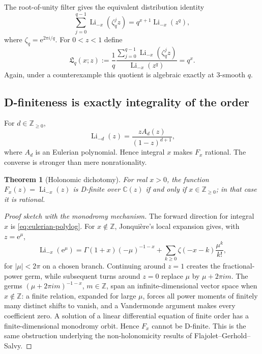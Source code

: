 \documentclass[11pt]{article}
\numberwithin{equation}{section}
\newtheorem{theorem}{Theorem}[section]
\theoremstyle{definition}
\theoremstyle{remark}
\newcommand{\Z}{\mathbb{Z}}
\newcommand{\C}{\mathbb{C}}
\newcommand{\Li}{\operatorname{Li}}
\newcommand{\e}{\mathrm{e}}
\begin{document}
The root-of-unity filter gives the equivalent distribution identity
\begin{equation}
 \sum_{j=0}^{q-1}\Li_{-x}(\zeta_q^jz)
 =q^{x+1}\Li_{-x}(z^q),
 \label{eq:polylog-distribution}
\end{equation}
where $\zeta_q=\e^{2\pi i/q}$.  For $0<z<1$ define
\begin{equation}
 \mathfrak L_q(x;z):=
 \frac{1}{q}\frac{\sum_{j=0}^{q-1}\Li_{-x}(\zeta_q^jz)}{\Li_{-x}(z^q)}=q^x.
 \label{eq:Lq}
\end{equation}
Again, under a counterexample this quotient is algebraic exactly at $3$-smooth $q$.

\subsection{D-finiteness is exactly integrality of the order}
For $d\in\Z_{\ge0}$,
\begin{equation}
 \Li_{-d}(z)=\frac{zA_d(z)}{(1-z)^{d+1}},
 \label{eq:eulerian-polylog}
\end{equation}
where $A_d$ is an Eulerian polynomial.  Hence integral $x$ makes $F_x$ rational.  The converse is stronger than mere nonrationality.

\begin{theorem}[Holonomic dichotomy]
\label{thm:holonomic}
For real $x>0$, the function $F_x(z)=\Li_{-x}(z)$ is D-finite over $\C(z)$ if and only if $x\in\Z_{\ge0}$; in that case it is rational.
\end{theorem}

\begin{proof}[Proof sketch with the monodromy mechanism]
The forward direction for integral $x$ is \eqref{eq:eulerian-polylog}.  For $x\notin\Z$, Jonqui\`ere's local expansion gives, with $z=\e^\mu$,
\begin{equation}
 \Li_{-x}(\e^\mu)
 =\Gamma(1+x)(-\mu)^{-1-x}
  +\sum_{k\ge0}\zeta(-x-k)\frac{\mu^k}{k!},
 \label{eq:jonquiere}
\end{equation}
for $|\mu|<2\pi$ on a chosen branch.  Continuing around $z=1$ creates the fractional-power germ, while subsequent turns around $z=0$ replace $\mu$ by $\mu+2\pi i m$.  The germs $(\mu+2\pi i m)^{-1-x}$, $m\in\Z$, span an infinite-dimensional vector space when $x\notin\Z$: a finite relation, expanded for large $\mu$, forces all power moments of finitely many distinct shifts to vanish, and a Vandermonde argument makes every coefficient zero.  A solution of a linear differential equation of finite order has a finite-dimensional monodromy orbit.  Hence $F_x$ cannot be D-finite.  This is the same obstruction underlying the non-holonomicity results of Flajolet--Gerhold--Salvy.
\end{proof}
\end{document}
